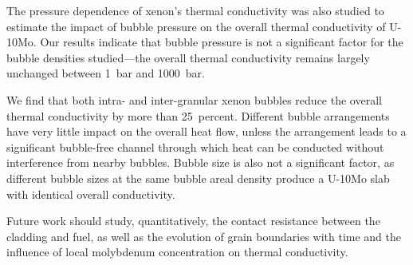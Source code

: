 The pressure dependence of xenon's thermal conductivity was also studied to estimate the impact of bubble pressure on the overall thermal conductivity of U-10Mo. Our results indicate that bubble pressure is not a significant factor for the bubble densities studied---the overall thermal conductivity remains largely unchanged between 1~bar and 1000~bar.

We find that both intra- and inter-granular xenon bubbles reduce the overall thermal conductivity by more than 25~percent. Different bubble arrangements have very little impact on the overall heat flow, unless the arrangement leads to a significant bubble-free channel through which heat can be conducted without interference from nearby bubbles. Bubble size is also not a significant factor, as different bubble sizes at the same bubble areal density produce a U-10Mo slab with identical overall conductivity.

Future work should study, quantitatively, the contact resistance between the cladding and fuel, as well as the evolution of grain boundaries with time and the influence of local molybdenum concentration on thermal conductivity.


